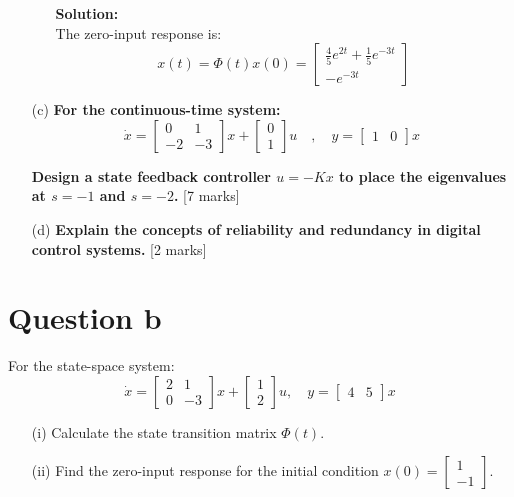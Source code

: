 \documentclass[12pt]{article}
\begin{document}
\begin{enumerate}
\begin{enumerate}
			\textbf{Solution:} \\
			The zero-input response is:
			\[
			x(t) = \Phi(t) x(0) = 
			\begin{bmatrix}
				\frac{4}{5}e^{2t} + \frac{1}{5}e^{-3t} \\
				-e^{-3t}
			\end{bmatrix}
			\]
		\end{enumerate}
		
		\item[(c)] \textbf{For the continuous-time system:}
		\[
		\dot{x} = \begin{bmatrix} 0 & 1 \\ -2 & -3 \end{bmatrix}x + \begin{bmatrix} 0 \\ 1 \end{bmatrix}u
		\quad , \quad
		y = \begin{bmatrix} 1 & 0 \end{bmatrix}x
		\]
		
		\textbf{Design a state feedback controller \( u = -Kx \) to place the eigenvalues at \( s = -1 \) and \( s = -2 \).} \hfill [7 marks]
		
		\item[(d)] \textbf{Explain the concepts of reliability and redundancy in digital control systems.} \hfill [2 marks]
	\end{enumerate}
	
	
	
	
	
	
	
	
	
	
	\section*{Question b}
	
	For the state-space system:
	\[
	\dot{x} = 
	\begin{bmatrix}
		2 & 1 \\ 
		0 & -3
	\end{bmatrix} x + 
	\begin{bmatrix}
		1 \\ 
		2
	\end{bmatrix} u,
	\quad
	y = 
	\begin{bmatrix}
		4 & 5
	\end{bmatrix} x
	\]
	\begin{enumerate}
		\item[(i)] Calculate the state transition matrix \(\Phi(t)\).
		\item[(ii)] Find the zero-input response for the initial condition \(x(0) = \begin{bmatrix} 1 \\ -1 \end{bmatrix}\).
	\end{enumerate}
	
\end{document}
